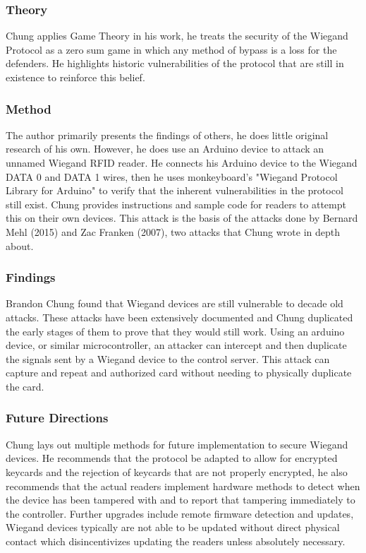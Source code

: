 \subsubsection{Theory}

\noindent
Chung applies Game Theory in his work, he treats the security of the Wiegand Protocol as a zero sum game in which any method of bypass is a loss for the defenders.  He highlights historic vulnerabilities of the protocol that are still in existence to reinforce this belief.

\subsubsection{Method}

\noindent
The author primarily presents the findings of others, he does little original research of his own.  However, he does use an Arduino device to attack an unnamed Wiegand RFID reader.  He connects his Arduino device to the Wiegand DATA 0 and DATA 1 wires, then he uses monkeyboard's "Wiegand Protocol Library for Arduino" to verify that the inherent vulnerabilities in the protocol still exist.  Chung provides instructions and sample code for readers to attempt this on their own devices. This attack is the basis of the attacks done by Bernard Mehl (2015) and Zac Franken (2007), two attacks that Chung wrote in depth about.

\subsubsection{Findings}

\noindent
Brandon Chung found that Wiegand devices are still vulnerable to decade old attacks.  These attacks have been extensively documented and Chung duplicated the early stages of them to prove that they would still work.  Using an arduino device, or similar microcontroller, an attacker can intercept and then duplicate the signals sent by a Wiegand device to the control server. This attack can capture and repeat and authorized card without needing to physically duplicate the card.

\subsubsection{Future Directions}

\noindent
Chung lays out multiple methods for future implementation to secure Wiegand devices.  He recommends that the protocol be adapted to allow for encrypted keycards and the rejection of keycards that are not properly encrypted, he also recommends that the actual readers implement hardware methods to detect when the device has been tampered with and to report that tampering immediately to the controller.  Further upgrades include remote firmware detection and updates, Wiegand devices typically are not able to be updated without direct physical contact which disincentivizes updating the readers unless absolutely necessary.

